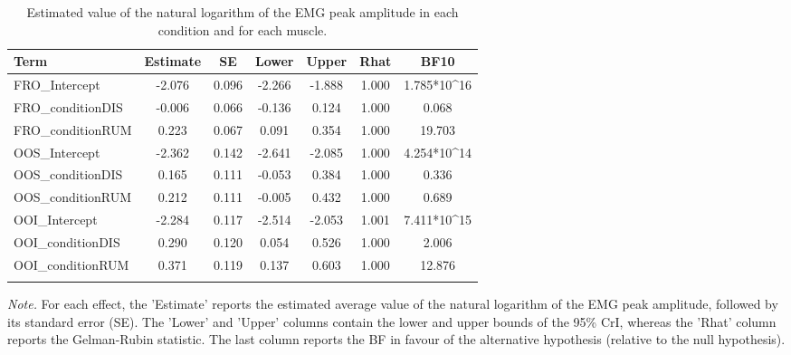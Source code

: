 \documentclass[
  english,
  man, donotrepeattitle,floatsintext]{apa6}
\begin{document}
\begin{table}[H]

\begin{center}
\begin{threeparttable}

\caption{\label{tab:summary}Estimated value of the natural logarithm of the EMG peak amplitude in each condition and for each muscle.}

\small{

\begin{tabular}{lcccccc}
\toprule
Term & \multicolumn{1}{c}{Estimate} & \multicolumn{1}{c}{SE} & \multicolumn{1}{c}{Lower} & \multicolumn{1}{c}{Upper} & \multicolumn{1}{c}{Rhat} & \multicolumn{1}{c}{BF10}\\
\midrule
FRO\_Intercept & -2.076 & 0.096 & -2.266 & -1.888 & 1.000 & 1.785*10\textasciicircum{}16\\
FRO\_conditionDIS & -0.006 & 0.066 & -0.136 & 0.124 & 1.000 & 0.068\\
FRO\_conditionRUM & 0.223 & 0.067 & 0.091 & 0.354 & 1.000 & 19.703\\
OOS\_Intercept & -2.362 & 0.142 & -2.641 & -2.085 & 1.000 & 4.254*10\textasciicircum{}14\\
OOS\_conditionDIS & 0.165 & 0.111 & -0.053 & 0.384 & 1.000 & 0.336\\
OOS\_conditionRUM & 0.212 & 0.111 & -0.005 & 0.432 & 1.000 & 0.689\\
OOI\_Intercept & -2.284 & 0.117 & -2.514 & -2.053 & 1.001 & 7.411*10\textasciicircum{}15\\
OOI\_conditionDIS & 0.290 & 0.120 & 0.054 & 0.526 & 1.000 & 2.006\\
OOI\_conditionRUM & 0.371 & 0.119 & 0.137 & 0.603 & 1.000 & 12.876\\
\bottomrule
\addlinespace
\end{tabular}

}

\begin{tablenotes}[para]
\normalsize{\textit{Note.} For each effect, the 'Estimate' reports the estimated average value of the natural logarithm of the EMG peak amplitude, followed by its standard error (SE). The 'Lower' and 'Upper' columns contain the lower and upper bounds of the 95\% CrI, whereas the 'Rhat' column reports the Gelman-Rubin statistic. The last column reports the BF in favour of the alternative hypothesis (relative to the null hypothesis).}
\end{tablenotes}

\end{threeparttable}
\end{center}

\end{table}
\end{document}
